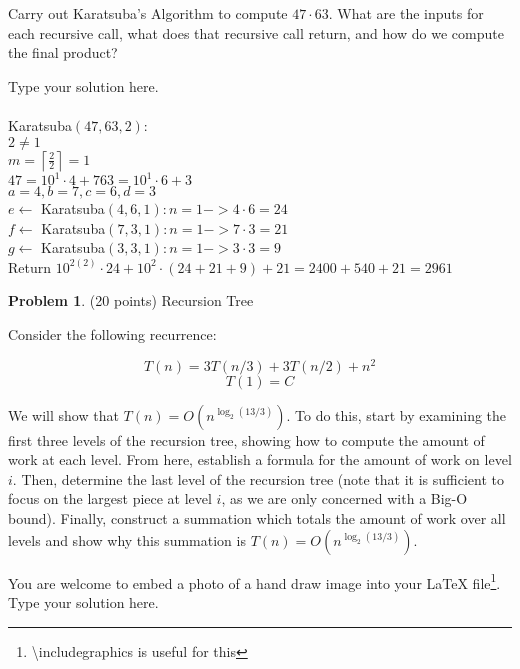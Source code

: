 \documentclass[11pt]{article}
\theoremstyle{definition}
\theoremstyle{theorem}
\newtheorem{prob}{Problem}
\newcommand{\solution}[1]{\medskip\noindent{\color{DarkBlue}\textbf{Solution:}} #1}
\newcommand{\solution}[1]{}
\begin{document}
\noindent Carry out Karatsuba's Algorithm to compute $47 \cdot 63$.  What are the inputs for each recursive call, what does that recursive call return, and how do we compute the final product?

\solution
Type your solution here. \\\\
Karatsuba$(47, 63, 2)$: \\
$2 \ne 1$ \\
$m = \left\lceil \frac{2}{2} \right\rceil = 1$ \\
$47 = 10^{1} \cdot 4 + 7      63 = 10^{1} \cdot 6 +3$ \\
$a = 4, b = 7, c = 6, d = 3$ \\
$e \longleftarrow$ Karatsuba$(4, 6, 1): n = 1 -> 4 \cdot 6 = 24$ \\
$f \longleftarrow$ Karatsuba$(7, 3, 1): n = 1 -> 7 \cdot 3 = 21$ \\
$g \longleftarrow$ Karatsuba$(3, 3, 1): n = 1 -> 3 \cdot 3 = 9$ \\
Return $10^{2(2)} \cdot 24 + 10^{2} \cdot (24 + 21 + 9) + 21 = 2400 + 540 + 21 = 2961$ \\

\newpage
\begin{prob} (20 points) Recursion Tree \end{prob}

\noindent Consider the following recurrence:

$$T(n) = 3T(n/3) + 3T(n/2) + n^2$$
$$T(1) = C$$

We will show that $T(n) = O(n^{\log_2 (13/3)})$. To do this, start by examining the first three levels of the recursion tree, showing how to compute the amount of work at each level. From here, establish a formula for the amount of work on level $i$. Then, determine the last level of the recursion tree (note that it is sufficient to focus on the largest piece at level $i$, as we are only concerned with a Big-O bound). Finally, construct a summation which totals the amount of work over all levels and show why this summation is $T(n) = O(n^{\log_2 (13/3)})$.

You are welcome to embed a photo of a hand draw image into your LaTeX file\footnote{\textbackslash includegraphics is useful for this}.\\

\solution
Type your solution here.
\end{document}
